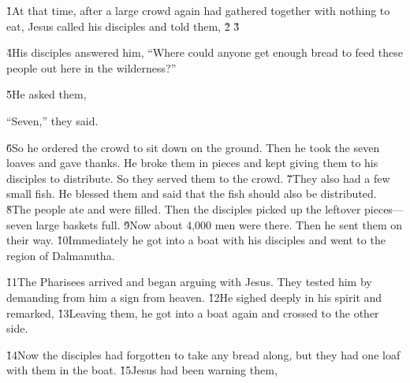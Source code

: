 \v{1}At that time, after a large crowd again had gathered together with nothing to eat, Jesus called his disciples and told them, \v{2} \v{3}

\v{4}His disciples answered him, ``Where could anyone get enough bread to feed these people out here in the wilderness?''

\v{5}He asked them, 

``Seven,'' they said.

\v{6}So he ordered the crowd to sit down on the ground. Then he took the seven loaves and gave thanks. He broke them in pieces and kept giving them to his disciples to distribute. So they served them to the crowd. \v{7}They also had a few small fish. He blessed them and said that the fish should also be distributed. \v{8}The people ate and were filled. Then the disciples picked up the leftover pieces---seven large baskets full. \v{9}Now about 4,000 men were there. Then he sent them on their way. \v{10}Immediately he got into a boat with his disciples and went to the region of Dalmanutha.

\v{11}The Pharisees arrived and began arguing with Jesus. They tested him by demanding from him a sign from heaven. \v{12}He sighed deeply in his spirit and remarked,  \v{13}Leaving them, he got into a boat again and crossed to the other side.

\v{14}Now the disciples had forgotten to take any bread along, but they had one loaf with them in the boat. \v{15}Jesus had been warning them, 

